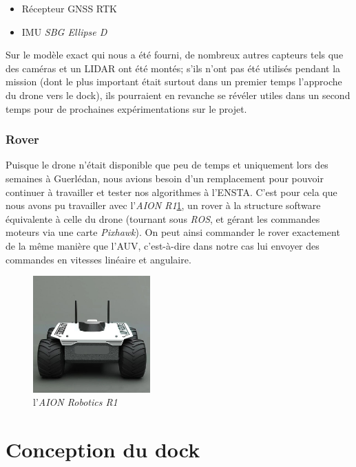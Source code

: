\documentclass[12pt]{report}
\begin{document}
\begin{itemize}
    \item Récepteur GNSS RTK
    \item IMU \textit{SBG Ellipse D}
\end{itemize}

Sur le modèle exact qui nous a été fourni, de nombreux autres capteurs tels que des caméras et un LIDAR ont été montés; s'ils n'ont pas été utilisés pendant la mission (dont le plus important était surtout dans un premier temps l'approche du drone vers le dock), ils pourraient en revanche se révéler utiles dans un second temps pour de prochaines expérimentations sur le projet.
\subsection{Rover}

Puisque le drone n'était disponible que peu de temps et uniquement lors des semaines à Guerlédan, nous avions besoin d'un remplacement pour pouvoir continuer à travailler et tester nos algorithmes à l'ENSTA. C'est pour cela que nous avons pu travailler avec l'\textit{AION R1}\ref{fig:rover}, un rover à la structure software équivalente à celle du drone (tournant sous \textit{ROS}, et gérant les commandes moteurs via une carte \textit{Pixhawk}). On peut ainsi commander le rover exactement de la même manière que l'AUV, c'est-à-dire dans notre cas lui envoyer des commandes en vitesses linéaire et angulaire.

\begin{figure}[H]
    \centering
    \includegraphics[width=0.4\textwidth]{imgs/rover.jpg}
    \caption{l'\textit{AION Robotics R1}}
    \label{fig:rover}
\end{figure}

\chapter{Conception du dock}
\end{document}
